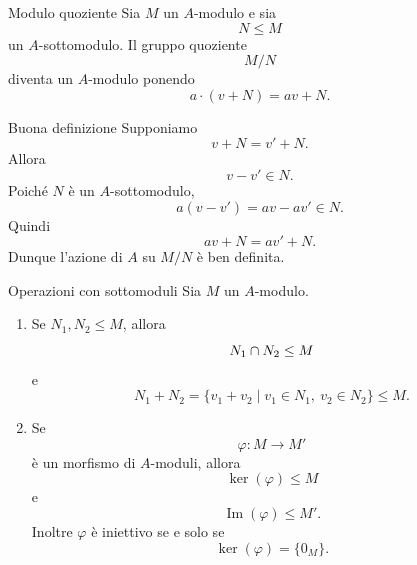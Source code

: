 \documentclass[a4paper]{article}
\begin{document}
\begin{radioactive}
\begin{snippetdefinition}{Modulo quoziente}
    Sia \(M\) un \(A\)-modulo e sia
    \[
        N\leq M
    \]
    un \(A\)-sottomodulo. Il gruppo quoziente
    \[
        M/N
    \]
    diventa un \(A\)-modulo ponendo
    \[
        a\cdot(v+N)=av+N.
    \]
\end{snippetdefinition}
\end{radioactive}

\begin{radioactive}
\begin{snippetproof}{Buona definizione}
    Supponiamo
    \[
        v+N=v'+N.
    \]
    Allora
    \[
        v-v'\in N.
    \]
    Poiché \(N\) è un \(A\)-sottomodulo,
    \[
        a(v-v')=av-av'\in N.
    \]
    Quindi
    \[
        av+N=av'+N.
    \]
    Dunque l'azione di \(A\) su \(M/N\) è ben definita.
\end{snippetproof}
\end{radioactive}

\begin{radioactive}
\begin{snippetproposition}{Operazioni con sottomoduli}
    Sia \(M\) un \(A\)-modulo.
    \begin{enumerate}
        \item Se \(N_1,N_2\leq M\), allora
        \[
            N_1\cap N_2\leq M
        \]
        e
        \[
            N_1+N_2=\{v_1+v_2\mid v_1\in N_1,\ v_2\in N_2\}\leq M.
        \]
        \item Se
        \[
            \varphi\colon M\to M'
        \]
        è un morfismo di \(A\)-moduli, allora
        \[
            \ker(\varphi)\leq M
        \]
        e
        \[
            \operatorname{Im}(\varphi)\leq M'.
        \]
        Inoltre \(\varphi\) è iniettivo se e solo se
        \[
            \ker(\varphi)=\{0_M\}.
        \]
    \end{enumerate}
\end{snippetproposition}
\end{radioactive}
\end{document}
